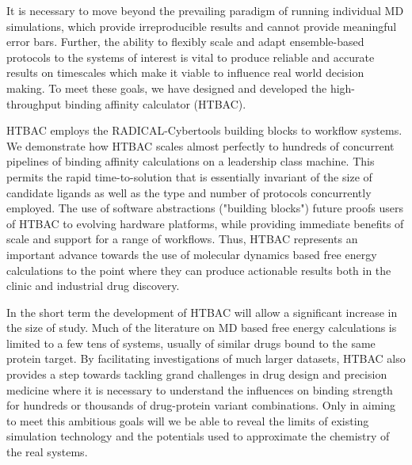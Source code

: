 




It is necessary to move beyond the prevailing paradigm of running individual
MD simulations, which provide irreproducible results and cannot provide
meaningful error bars. Further, the ability to flexibly scale and adapt
ensemble-based protocols to the systems of interest is vital to produce
reliable and accurate results on timescales which make it viable to influence
real world decision making. To meet these goals, we have designed and
developed the high-throughput binding affinity calculator (HTBAC).

HTBAC employs the RADICAL-Cybertools building blocks to workflow systems. We
demonstrate how HTBAC scales almost perfectly to hundreds of concurrent
pipelines of binding affinity calculations on a leadership class machine. This
permits the rapid time-to-solution that is essentially invariant of the size
of candidate ligands as well as the type and number of protocols concurrently
employed. The use of software abstractions ("building blocks") future proofs
users of HTBAC to evolving hardware platforms, while providing immediate
benefits of scale and support for a range of workflows. Thus, HTBAC represents
an important advance towards the use of molecular dynamics based free energy
calculations to the point where they can produce actionable results both in
the clinic and industrial drug discovery.

In the short term the development of HTBAC will allow a significant increase
in the size of study. Much of the literature on MD based free energy
calculations is limited to a few tens of systems, usually of similar drugs
bound to the same protein target. By facilitating investigations of much
larger datasets, HTBAC also provides a step towards tackling grand challenges
in drug design and precision medicine where it is necessary to understand the
influences on binding strength for hundreds or thousands of drug-protein
variant combinations. Only in aiming to meet this ambitious goals will we be
able to reveal the limits of existing simulation technology and the potentials
used to approximate the chemistry of the real systems.

